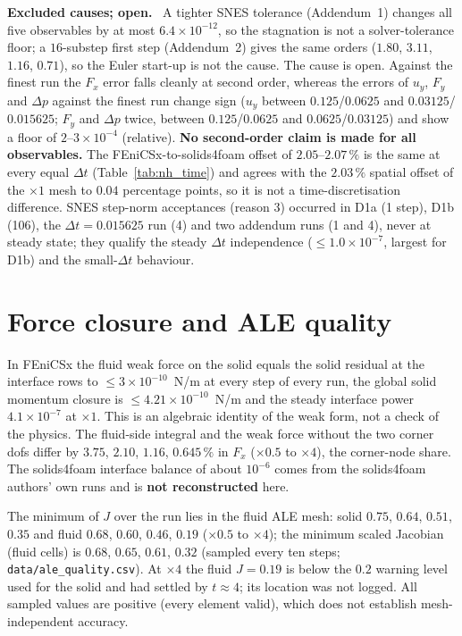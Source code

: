 \documentclass[sn-mathphys,Numbered]{sn-jnl}
\renewcommand{\paragraph}[1]{\par\vspace{0.3\baselineskip}\noindent\textbf{#1}\ }
\newcommand{\FE}{FEniCSx}
\begin{document}
\paragraph{Excluded causes; open.}
A tighter SNES tolerance (Addendum~1) changes all five observables by at most $6.4\times10^{-12}$, so the stagnation is not a solver-tolerance floor; a $16$-substep first step (Addendum~2) gives the same orders ($1.80$, $3.11$, $1.16$, $0.71$), so the Euler start-up is not the cause. The cause is open. Against the finest run the $F_x$ error falls cleanly at second order, whereas the errors of $u_y$, $F_y$ and $\Delta p$ against the finest run change sign ($u_y$ between $0.125$/$0.0625$ and $0.03125$/$0.015625$; $F_y$ and $\Delta p$ twice, between $0.125$/$0.0625$ and $0.0625$/$0.03125$) and show a floor of $2$--$3\times10^{-4}$ (relative). \textbf{No second-order claim is made for all observables.} The \FE{}-to-solids4foam offset of $2.05$--$2.07\,\%$ is the same at every equal $\Delta t$ (Table~\ref{tab:nh_time}) and agrees with the $2.03\,\%$ spatial offset of the $\times1$ mesh to $0.04$ percentage points, so it is not a time-discretisation difference. SNES step-norm acceptances (reason 3) occurred in D1a (1 step), D1b (106), the $\Delta t=0.015625$ run (4) and two addendum runs (1 and 4), never at steady state; they qualify the steady $\Delta t$ independence ($\le1.0\times10^{-7}$, largest for D1b) and the small-$\Delta t$ behaviour.


\section{Force closure and ALE quality}\label{sec:nh_force}
In \FE{} the fluid weak force on the solid equals the solid residual at the interface rows to $\le3\times10^{-10}$~N/m at every step of every run, the global solid momentum closure is $\le4.21\times10^{-10}$~N/m and the steady interface power $4.1\times10^{-7}$ at $\times1$. This is an algebraic identity of the weak form, not a check of the physics. The fluid-side integral and the weak force without the two corner dofs differ by $3.75$, $2.10$, $1.16$, $0.645\,\%$ in $F_x$ ($\times0.5$ to $\times4$), the corner-node share. The solids4foam interface balance of about $10^{-6}$ comes from the solids4foam authors' own runs and is \textbf{not reconstructed} here.

The minimum of $J$ over the run lies in the fluid ALE mesh: solid $0.75$, $0.64$, $0.51$, $0.35$ and fluid $0.68$, $0.60$, $0.46$, $0.19$ ($\times0.5$ to $\times4$); the minimum scaled Jacobian (fluid cells) is $0.68$, $0.65$, $0.61$, $0.32$ (sampled every ten steps; \texttt{data/ale\_quality.csv}). At $\times4$ the fluid $J=0.19$ is below the $0.2$ warning level used for the solid and had settled by $t\approx4$; its location was not logged. All sampled values are positive (every element valid), which does not establish mesh-independent accuracy.
\end{document}

